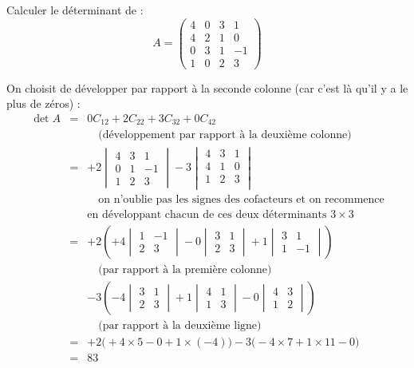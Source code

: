 \documentclass{book}
\begin{document}
\begin{Exemple}
Calculer le déterminant de :
$$A = \begin{pmatrix}
4 & 0 & 3 & 1\\
4 & 2 & 1 & 0\\
0 & 3 & 1 & -1\\
1 & 0 & 2 & 3
\end{pmatrix}
$$
\begin{Demonstration}
On choisit de développer par rapport à la seconde colonne
(car c'est là qu'il y a le plus de zéros) :
$$\begin{array}{rcl}
\det A
  & = & 0 C_{12} + 2 C_{22} + 3 C_{32}+0 C_{42}\\[5pt]
   && \quad\text{(développement par rapport à la deuxième colonne)} \\[5pt]
  & = & +2 \begin{vmatrix}4&3&1\\0&1&-1\\1&2&3 \end{vmatrix}
        -3 \begin{vmatrix}4&3&1\\4&1&0\\1&2&3\\ \end{vmatrix} \\[5pt]
       && \quad \text{on n'oublie pas les signes des cofacteurs et on recommence} \\[5pt]
  & & \text{en développant chacun de ces deux déterminants $3\times 3$} \\[5pt]
  & = & +2 \left(+4\begin{vmatrix}1&-1\\2&3\end{vmatrix}-0\begin{vmatrix}3&1\\2&3\end{vmatrix}
  +1\begin{vmatrix}3&1\\1&-1\end{vmatrix}\right)\\[5pt]
  &&\quad \text{(par rapport à la première colonne)}\\[5pt]
  &   & -3\left(-4\begin{vmatrix}3&1\\2&3\end{vmatrix}+1\begin{vmatrix}4&1\\1&3\end{vmatrix}
  -0\begin{vmatrix}4&3\\1&2\end{vmatrix}\right) \\[5pt]
  &&\quad\text{(par rapport à la deuxième ligne)}\\[5pt]
 & = & +2 \big(+4\times 5-0 +1\times(-4)\big)
 		-3\big(-4\times7 +1\times11 - 0 \big)\\[5pt]
  & = & 83\\
\end{array}$$
\end{Demonstration}
\end{Exemple}
\end{document}
